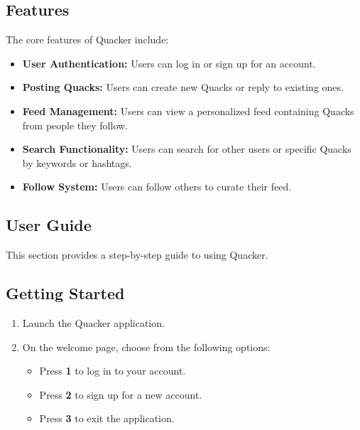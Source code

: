 \documentclass[letterpaper, 11pt]{article}
\begin{document}
\subsection{Features}
The core features of Quacker include:
\begin{itemize}
    \item \textbf{User Authentication:} Users can log in or sign up for an account.
    \item \textbf{Posting Quacks:} Users can create new Quacks or reply to existing ones.
    \item \textbf{Feed Management:} Users can view a personalized feed containing Quacks from people they follow.
    \item \textbf{Search Functionality:} Users can search for other users or specific Quacks by keywords or hashtags.
    \item \textbf{Follow System:} Users can follow others to curate their feed.
\end{itemize}

\subsection{User Guide}
This section provides a step-by-step guide to using Quacker.

\subsection*{Getting Started}
\begin{enumerate}
    \item Launch the Quacker application.
    \item On the welcome page, choose from the following options:
        \begin{itemize}
            \item Press \textbf{1} to log in to your account.
            \item Press \textbf{2} to sign up for a new account.
            \item Press \textbf{3} to exit the application.
        \end{itemize}
\end{enumerate}
\end{document}
